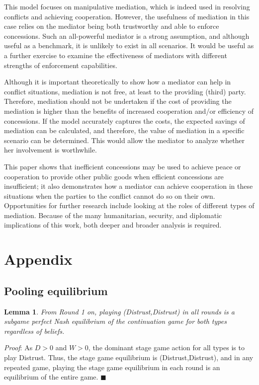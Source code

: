 \documentclass[bibtex,autowc]{apsr_submission}
\newtheorem{lemma}{Lemma}
\begin{document}
This model focuses on manipulative mediation, which is indeed used in resolving conflicts and achieving cooperation. However, the usefulness of mediation in this case relies on the mediator being both trustworthy and able to enforce concessions. Such an all-powerful mediator is a strong assumption, and although useful as a benchmark, it is unlikely to exist in all scenarios. It would be useful as a further exercise to examine the effectiveness of mediators with different strengths of enforcement capabilities. 

Although it is important theoretically to show how a mediator can help in conflict situations, mediation is not free, at least to the providing (third) party. Therefore, mediation should not be undertaken if the cost of providing the mediation is higher than the benefits of increased cooperation and/or efficiency of concessions. If the model accurately captures the costs, the expected savings of mediation can be calculated, and therefore, the value of mediation in a specific scenario can be determined. This would allow the mediator to analyze whether her involvement is worthwhile. 

This paper shows that inefficient concessions may be used to achieve peace or cooperation to provide other public goods when efficient concessions are insufficient; it also demonstrates how a mediator can achieve cooperation in these situations when the parties to the conflict cannot do so on their own. Opportunities for further research include looking at the roles of different types of mediation. Because of the many humanitarian, security, and diplomatic implications of this work, both deeper and broader analysis is required.

\section{Appendix}


\subsection{Pooling equilibrium}
\begin{lemma}
	From Round 1 on, playing (Distrust,Distrust) in all rounds is a subgame perfect Nash equilibrium of the continuation game for both types regardless of beliefs.
	\label{lemma:1}
\end{lemma}
\emph{Proof}: As $D>0$ and $W>0$, the dominant stage game action for all types is to play Distrust. Thus, the stage game equilibrium is (Distrust,Distrust), and in any repeated game, playing the stage game equilibrium in each round is an equilibrium of the entire game. \hfill $\blacksquare$\\
\end{document}
